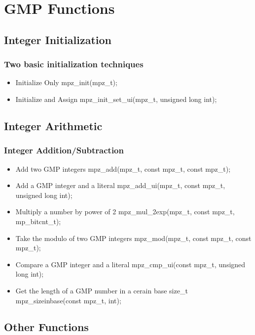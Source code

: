 \section{GMP Functions}


\subsection{Integer Initialization}

\begin{frame}
\frametitle{Two basic initialization techniques}
\begin{itemize}
  \item Initialize Only
  mpz_init(mpz_t);
  \item Initialize and Assign
  mpz_init_set_ui(mpz_t, unsigned long int);
\end{itemize}
\end{frame}


\subsection{Integer Arithmetic}

\begin{frame}
\frametitle{Integer Addition/Subtraction}
\begin{itemize}
  \item Add two GMP integers
  mpz_add(mpz_t, const mpz_t, const mpz_t);
  \item Add a GMP integer and a literal
  mpz_add_ui(mpz_t, const mpz_t, unsigned long int);
  \item Multiply a number by power of 2
  mpz_mul_2exp(mpz_t, const mpz_t, mp_bitcnt_t);
  \item Take the modulo of two GMP integers
  mpz_mod(mpz_t, const mpz_t, const mpz_t);
  \item Compare a GMP integer and a literal
  mpz_cmp_ui(const mpz_t, unsigned long int);
  \item Get the length of a GMP number in a cerain base
  size_t mpz_sizeinbase(const mpz_t, int);
\end{itemize}
\end{frame}


\subsection{Other Functions}

